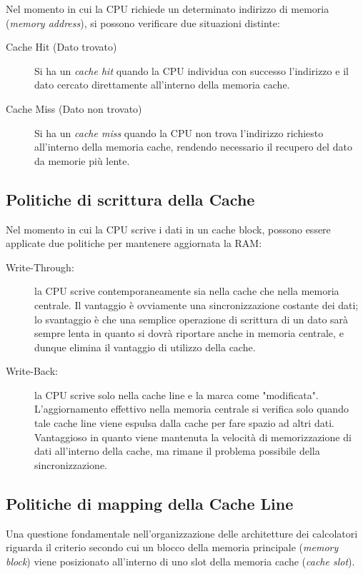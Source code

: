 \documentclass[12pt]{report}
\begin{document}
	Nel momento in cui la CPU richiede un determinato indirizzo di memoria (\textit{memory address}), si possono verificare due situazioni distinte:
	
	\begin{description}
		
		\item [Cache Hit (Dato trovato)] Si ha un \textit{cache hit} quando la CPU individua con successo l'indirizzo e il dato cercato direttamente all'interno della memoria cache.
		
		\item [Cache Miss (Dato non trovato)] Si ha un \textit{cache miss} quando la CPU non trova l'indirizzo richiesto all'interno della memoria cache, rendendo necessario il recupero del dato da memorie più lente.
		
	\end{description}
	
	\subsection{Politiche di scrittura della Cache}
	Nel momento in cui la CPU scrive i dati in un cache block, possono essere applicate due politiche per mantenere aggiornata la RAM:
	\begin{description}
		\item [Write-Through:] la CPU scrive contemporaneamente sia nella cache che nella memoria centrale. Il vantaggio è ovviamente una sincronizzazione costante dei dati; lo svantaggio è che una semplice operazione di scrittura di un dato sarà sempre lenta in quanto si dovrà riportare anche in memoria centrale, e dunque elimina il vantaggio di utilizzo della cache.
		
		\item [Write-Back:] la CPU scrive solo nella cache line e la marca come "modificata". L'aggiornamento effettivo nella memoria centrale si verifica solo quando tale cache line viene espulsa dalla cache per fare spazio ad altri dati. Vantaggioso in quanto viene mantenuta la velocità di memorizzazione di dati all'interno della cache, ma rimane il problema possibile della sincronizzazione.
	\end{description}
	
	\subsection{Politiche di mapping della Cache Line}
	
	Una questione fondamentale nell'organizzazione delle architetture dei calcolatori riguarda il criterio secondo cui un blocco della memoria principale (\textit{memory block}) viene posizionato all'interno di uno slot della memoria cache (\textit{cache slot}). 
	
\end{document}
